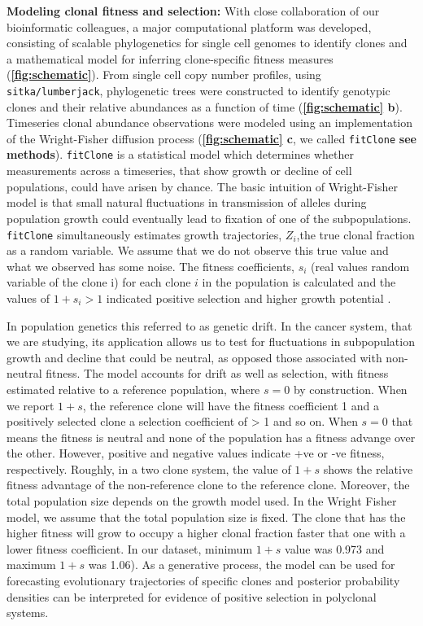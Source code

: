\textbf{Modeling clonal fitness and selection:} With close collaboration of our bioinformatic colleagues, a major computational platform was developed, consisting of scalable phylogenetics for single cell genomes to identify clones and a mathematical model for inferring clone-specific fitness measures (\textbf{\autoref{fig:schematic}}).
From single cell copy number profiles, using \texttt{sitka/lumberjack},  phylogenetic trees were constructed to identify genotypic clones and their relative abundances as a function of time (\textbf{\autoref{fig:schematic} b}).
Timeseries clonal abundance observations were modeled using an implementation of the Wright-Fisher diffusion process  (\textbf{\autoref{fig:schematic} c}, we called \texttt{fitClone} \textbf{see methods}). \texttt{fitClone} is a statistical model which determines whether measurements across a timeseries, that show growth or decline of cell populations, could have arisen by chance.
The basic intuition of Wright-Fisher model is that small natural fluctuations in transmission of alleles during population growth could eventually lead to fixation of one of the subpopulations. \texttt{fitClone} simultaneously estimates growth trajectories, $Z_i$,the true clonal fraction as a random variable. We assume that we do not observe this true value and what we observed has some noise. The fitness coefficients, $s_i$ (real values random variable of the clone i) for each clone $i$ in the population is calculated and the values of $1+s_i>1$ indicated positive selection and higher growth potential \cite{salichos2020estimating}. 

In population genetics this referred to as genetic drift. In the cancer system, that we are studying, its application allows us to test for fluctuations in subpopulation growth and decline that could be neutral, as opposed those associated with non-neutral fitness. 
The model accounts for drift as well as selection, with fitness estimated relative to a reference population, where $s=0$ by construction. When we report $1 + s$, the reference clone will have the fitness coefficient 1 and a positively selected clone a selection coefficient of > 1 and so on.
When $s=0$ that means the fitness is neutral and none of the population has a fitness advange over the other. However, positive and negative values indicate +ve or -ve fitness, respectively. Roughly, in a two clone system, the value of $1 + s$ shows the relative fitness advantage of the non-reference clone to the reference clone. Moreover, the total population size depends on the growth model used. In the Wright Fisher model, we assume that the total population size is fixed. The clone that has the higher fitness will grow to occupy a higher clonal fraction faster that one with a lower fitness coefficient. In our dataset, minimum $1 + s$ value was 0.973 and maximum $1 + s$ was 1.06). 
As a generative process, the model can be used for forecasting evolutionary trajectories of specific clones and posterior probability densities can be interpreted for evidence of positive selection in polyclonal systems. 

